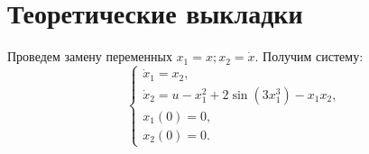 \documentclass[11pt]{article}
\begin{document}
	\newpage
	{\vspace*{-2cm} \hspace*{-1cm}\section{Теоретические выкладки}}
	{Проведем замену переменных $x_1 = x;  x_2 = \dot x.$ Получим систему:}
	\begin{equation}
		\begin{cases}
		\dot x_1 = x_2,\\
		\dot x_2 = u - x_1^2 + 2\sin(3x_1^3) - x_1 x_2,\\
		x_1(0) = 0,\\
		x_2(0) = 0.
		\end{cases}
	\end{equation}
	
\end{document}
